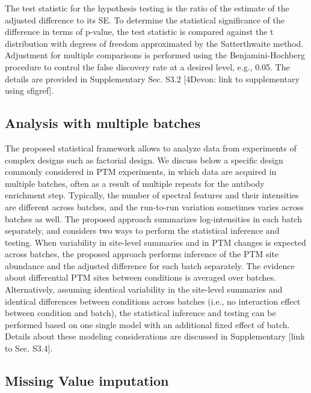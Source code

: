 \documentclass[mcp]{article}
\numberwithin{figure}{section} %
\numberwithin{table}{section}
\def\todo#1{{\color{red}[#1]}}
\def\devon#1{{\color{green}[4Devon: #1]}}
\begin{document}
The test statistic for the hypothesis testing is the ratio of the estimate of the adjusted difference to its SE. To determine the statistical significance of the difference in terms of p-value, the test statistic is compared against the t distribution with degrees of freedom approximated by the Satterthwaite method. \cite{satterthwaite:1946} Adjustment for multiple comparisons is performed using the Benjamini-Hochberg procedure to control the false discovery rate at a desired level, e.g., 0.05.\cite{Benjamini:1995} The details are provided in Supplementary Sec. S3.2 \devon{link to supplementary using sfigref}.

\subsection*{Analysis with multiple batches}

The proposed statistical framework allows to analyze data from experiments of complex designs such as factorial design. We discuss below a specific design commonly considered in PTM experiments, in which data are acquired in multiple batches, often as a result of multiple repeats for the antibody enrichment step. Typically, the number of spectral features and their intensities are different across batches, and the run-to-run variation sometimes varies across batches as well. The proposed approach summarizes log-intensities in each batch separately, and considers two ways to perform the statistical inference and testing. When variability in site-level summaries and in PTM changes is expected across batches, the proposed approach performs inference of the PTM site abundance and the adjusted difference for each batch separately. The evidence about differential PTM sites between conditions is averaged over batches. Alternatively, assuming identical variability in the site-level summaries and identical differences between conditions across batches (i.e., no interaction effect between condition and batch), the statistical inference and testing can be performed based on one single model with an additional fixed effect of batch. Details about these modeling considerations are discussed in Supplementary \todo{link to Sec. S3.4}.

\subsection*{Missing Value imputation}
\end{document}
